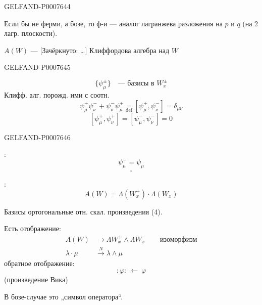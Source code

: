\begin{GelfandAdjacentEvidence}{GELFAND-P000764}{4}


Если бы не ферми, а бозе, то ф-и --- аналог лагранжева разложения на \(p\) и \(q\) (на 2 лагр. плоскости).

\(A(W)\) --- [Зачёркнуто: …] Клиффордова алгебра над \(W\)
\end{GelfandAdjacentEvidence}
\begin{GelfandAdjacentEvidence}{GELFAND-P000764}{5}

\[
\{\psi_\mu^\pm\}\quad\text{--- базисы в }W_x^\pm
\]
Клифф. алг. порожд. ими с соотн.
\begin{equation*}
\tag*{\((9)_1\)}
\psi_\mu^+\psi_\nu^-+\psi_\nu^-\psi_\mu^+
\underset{\mathrm{def}}{=}[\psi_\mu^+,\psi_\nu^-]=\delta_{\mu\nu}
\end{equation*}
\begin{equation*}
\tag*{\((9)_2\)}
[\psi_\mu^+,\psi_\nu^+]=[\psi_\mu^-,\psi_\nu^-]=0
\end{equation*}
\end{GelfandAdjacentEvidence}
\begin{GelfandAdjacentEvidence}{GELFAND-P000764}{6}


:
\[
\underline{\underline{\psi_\mu^-=\psi_\mu}}
\]

:
\begin{equation*}
\tag{10}
A(W)=\Lambda(W_x^+)\cdot\Lambda(W_x)
\end{equation*}
\end{GelfandAdjacentEvidence}


Базисы ортогональные отн. скал. произведения (4).

Есть отображение:
\[
\begin{aligned}
A(W)&\longrightarrow\Lambda W_x^+\wedge\Lambda W_x^-\qquad\text{изоморфизм}\\
\lambda\cdot\mu&\overset{N}{\longrightarrow}\lambda\wedge\mu
\end{aligned}
\]
обратное отображение:
\[
{:}\varphi{:}\ \longleftarrow\ \varphi
\]
(произведение Вика)

В бозе-случае это „символ оператора“.


